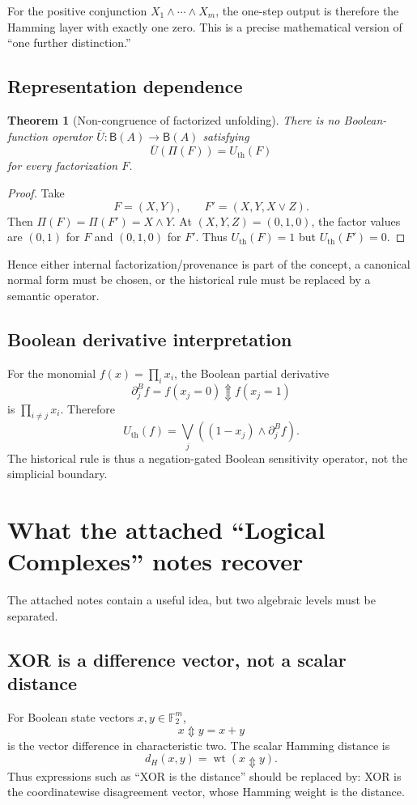 \documentclass[11pt]{article}
\newtheorem{theorem}{Theorem}[section]
\newcommand{\Ftwo}{\mathbb F_2}
\newcommand{\wt}{\operatorname{wt}}
\newcommand{\Updown}{\mathbin{\Updownarrow}}
\begin{document}
For the positive conjunction $X_1\wedge\cdots\wedge X_m$, the one-step output is therefore the Hamming layer with exactly one zero.  This is a precise mathematical version of ``one further distinction.''

\subsection{Representation dependence}

\begin{theorem}[Non-congruence of factorized unfolding]\label{thm:noncongruence}
There is no Boolean-function operator $\overline U:\mathsf B(A)\to\mathsf B(A)$ satisfying
\[
\overline U(\Pi(F))=U_{\mathrm{th}}(F)
\]
for every factorization $F$.
\end{theorem}
\begin{proof}
Take
\[
F=(X,Y),\qquad F'=(X,Y,X\vee Z).
\]
Then $\Pi(F)=\Pi(F')=X\wedge Y$.  At $(X,Y,Z)=(0,1,0)$, the factor values are $(0,1)$ for $F$ and $(0,1,0)$ for $F'$.  Thus $U_{\mathrm{th}}(F)=1$ but $U_{\mathrm{th}}(F')=0$.
\end{proof}

Hence either internal factorization/provenance is part of the concept, a canonical normal form must be chosen, or the historical rule must be replaced by a semantic operator.

\subsection{Boolean derivative interpretation}
For the monomial $f(x)=\prod_i x_i$, the Boolean partial derivative
\[
\partial_j^Bf=f(x_j=0)\Updown f(x_j=1)
\]
is $\prod_{i\neq j}x_i$.  Therefore
\[
U_{\mathrm{th}}(f)
=\bigvee_j\left((1-x_j)\wedge\partial_j^Bf\right).
\]
The historical rule is thus a negation-gated Boolean sensitivity operator, not the simplicial boundary.

\section{What the attached ``Logical Complexes'' notes recover}

The attached notes contain a useful idea, but two algebraic levels must be separated.

\subsection{XOR is a difference vector, not a scalar distance}
For Boolean state vectors $x,y\in\Ftwo^m$,
\[
x\Updown y=x+y
\]
is the vector difference in characteristic two.  The scalar Hamming distance is
\[
d_H(x,y)=\wt(x\Updown y).
\]
Thus expressions such as ``XOR is the distance'' should be replaced by: XOR is the coordinatewise disagreement vector, whose Hamming weight is the distance.
\end{document}
